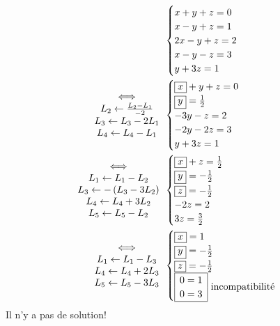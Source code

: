 \begin{exm}
	\begin{align*}
		&\begin{cases}
			x + y +z = 0\\
			x - y + z = 1\\
			2x - y + z = 2\\
			x - y - z = 3\\
			y + 3z = 1
		\end{cases}\\
		\begin{array}{c}
			\iff\\
			L_2\leftarrow \frac{L_2-L_1}{-2}\\
			L_3\leftarrow L_3 - 2L_1\\
			L_4\leftarrow L_4 - L_1\\
		\end{array}&
		\begin{cases}
			\fbox{$x$} + y + z = 0\\
			\fbox{$y$} = \frac{1}{2}\\
			-3y - z = 2\\
			-2y -2z = 3\\
			y + 3z = 1
		\end{cases}\\
		\begin{array}{c}
			\iff\\
			L_1\leftarrow L_1-L_2\\
			L_3 \leftarrow -\left( L_3 - 3L_2 \right)\\
			L_4 \leftarrow L_4 +3 L_2\\
			L_5 \leftarrow L_5 - L_2
		\end{array} &
		\begin{cases}
			\fbox{$x$} + z = \frac{1}{2}\\
			\fbox{$y$} = -\frac{1}{2}\\
			\fbox{$z$} = -\frac{1}{2}\\
			-2z = 2\\
			3z = \frac{3}{2}
		\end{cases}\\
		\begin{array}{c}
			\iff\\
			L_1 \leftarrow L_1 - L_3\\
			L_4 \leftarrow L_4 + 2L_3\\
			L_5 \leftarrow L_5 - 3L_3
		\end{array} &
		\begin{cases}
			\fbox{$x$} = 1\\
			\fbox{$y$} = -\frac{1}{2}\\
			\fbox{$z$} = -\frac{1}{2}\\
			\begin{array}{|c|}
				\hline
				0 = 1\\
				0 = 3\\
				\hline
			\end{array} 
			\text{ incompatibilité }
		\end{cases}
	\end{align*}
	Il n'y a pas de solution!
\end{exm}

